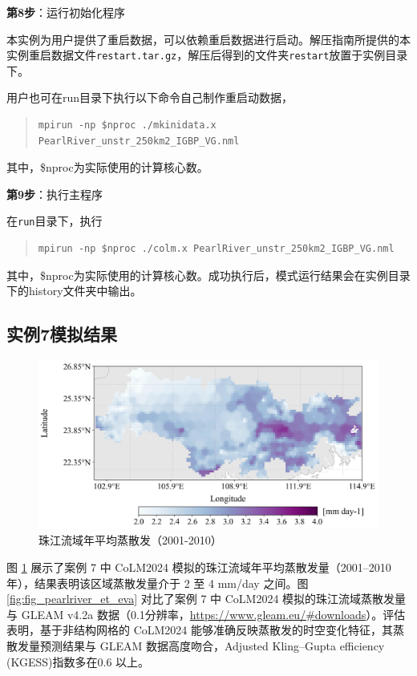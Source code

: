 \bigskip
\textbf{第8步}：运行初始化程序

本实例为用户提供了重启数据，可以依赖重启数据进行启动。解压指南所提供的本实例重启数据文件\texttt{restart.tar.gz}，解压后得到的文件夹\texttt{restart}放置于实例目录下。

用户也可在run目录下执行以下命令自己制作重启动数据，
\begin{quote}
\begin{lstlisting}
mpirun -np $nproc ./mkinidata.x PearlRiver_unstr_250km2_IGBP_VG.nml
\end{lstlisting}
\end{quote}
其中，\$nproc为实际使用的计算核心数。

\bigskip
\textbf{第9步}：执行主程序

在\texttt{run}目录下，执行
\begin{quote}
\begin{lstlisting}
mpirun -np $nproc ./colm.x PearlRiver_unstr_250km2_IGBP_VG.nml
\end{lstlisting}
\end{quote}
其中，\$nproc为实际使用的计算核心数。成功执行后，模式运行结果会在实例目录下的history文件夹中输出。

\subsection{实例7模拟结果}


\begin{figure}[htpb]
    \centering
    \includegraphics[width=\textwidth]{figures/Example07_PearlRiver_unstr_ET_mean.jpg}
    \caption{珠江流域年平均蒸散发（2001-2010）}
    \label{fig:fig_pearlriver_et}
\end{figure}


图 \ref{fig:fig_pearlriver_et} 展示了案例 7 中 CoLM2024 模拟的珠江流域年平均蒸散发量（2001--2010 年），结果表明该区域蒸散发量介于 2 至 4 mm/day 之间。图 \ref{fig:fig_pearlriver_et_eva} 对比了案例 7 中 CoLM2024 模拟的珠江流域蒸散发量与 GLEAM v4.2a 数据（0.1\textdegree 分辨率，\url{https://www.gleam.eu/\#downloads}）。评估表明，基于非结构网格的 CoLM2024 能够准确反映蒸散发的时空变化特征，其蒸散发量预测结果与 GLEAM 数据高度吻合，Adjusted Kling–Gupta efficiency (KGESS)指数多在0.6 以上。

